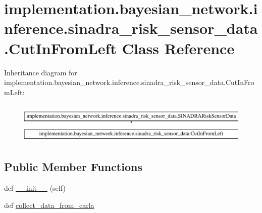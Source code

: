 \hypertarget{classimplementation_1_1bayesian__network_1_1inference_1_1sinadra__risk__sensor__data_1_1_cut_in_from_left}{}\section{implementation.\+bayesian\+\_\+network.\+inference.\+sinadra\+\_\+risk\+\_\+sensor\+\_\+data.\+Cut\+In\+From\+Left Class Reference}
\label{classimplementation_1_1bayesian__network_1_1inference_1_1sinadra__risk__sensor__data_1_1_cut_in_from_left}
Inheritance diagram for implementation.\+bayesian\+\_\+network.\+inference.\+sinadra\+\_\+risk\+\_\+sensor\+\_\+data.\+Cut\+In\+From\+Left\+:\begin{figure}[H]
\begin{center}
\leavevmode
\includegraphics[height=1.989343cm]{classimplementation_1_1bayesian__network_1_1inference_1_1sinadra__risk__sensor__data_1_1_cut_in_from_left}
\end{center}
\end{figure}
\subsection*{Public Member Functions}
\begin{DoxyCompactItemize}
\item 
def \hyperlink{classimplementation_1_1bayesian__network_1_1inference_1_1sinadra__risk__sensor__data_1_1_cut_in_from_left_a6036f843dffbf16aba9cf950d6ccefa1}{\+\_\+\+\_\+init\+\_\+\+\_\+} (self)
\item 
def \hyperlink{classimplementation_1_1bayesian__network_1_1inference_1_1sinadra__risk__sensor__data_1_1_cut_in_from_left_a40bc2bd36793756ca55c297073ea1bbe}{collect\+\_\+data\+\_\+from\+\_\+carla}
\end{DoxyCompactItemize}
